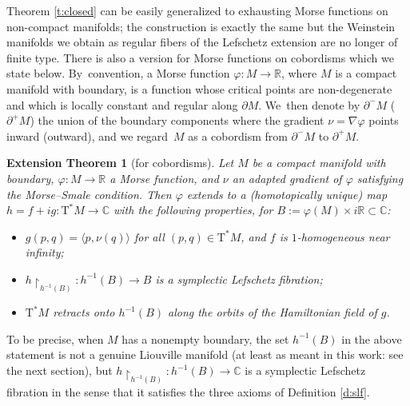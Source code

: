 \documentclass[JEP,XML,SOM,Unicode]{cedram}
\newcommand{\C}{{\mathbb C}}
\newcommand{\R}{{\mathbb R}}
\newcommand{\tu}[1]{\textup{#1}}
\newcommand{\sT}{\mathrm{T}^\ast}
\newcommand{\prg}[1]{\langle #1 \rangle}
\newcommand{\de}{\mathrel{:=}}
\newcommand{\rst}[1]{{\upharpoonright}_{\!#1}}
\let\del\partial
\let\on\colon
\theoremstyle{plain}
\newtheorem{extension-theorem}[theorem]{Extension Theorem}
\theoremstyle{definition}
\begin{document}
Theorem \ref{t:closed} can be easily generalized to exhausting Morse functions
on non-compact manifolds; the construction is exactly the same but the Weinstein
manifolds we obtain as regular fibers of the Lefschetz extension are no longer
of finite type. There is also a version for Morse functions on cobordisms which
we state below. By~convention, a Morse function $\varphi \on M \to \R$, where
$M$ is a compact manifold with boundary, is a function whose critical points are
non-degenerate and which is locally constant and regular along $\del M$. We~then
denote by $\del^-M$ (\resp $\del^+M$) the union of the boundary components
where the gradient $\nu = \nabla\varphi$ points inward (\resp outward), and we
regard~$M$ as a cobordism from $\del^-M$ to $\del^+M$.

\begin{extension-theorem}[for cobordisms] \label{t:compact}
Let $M$ be a compact manifold with boundary, $\varphi \on M \to \R$ a Morse
function, and $\nu$ an adapted gradient of $\varphi$ satisfying the Morse--Smale
condition. Then $\varphi$ extends to a \tu(homotopically unique\tu) map \hbox{$h =f+ig \on \sT M \to \C$} with the following properties, for $B \de
\varphi(M) \times i\R \subset \C$\tu:
\begin{itemize}
\item
$g(p,q) = \prg{p,\nu(q)}$ for all $(p,q) \in \sT M$, and $f$ is $1$-homogeneous
near infinity;
\item
$h \rst{h^{-1}(B)} \on h^{-1}(B) \to B$ is a symplectic Lefschetz fibration\tu;
\item
$\sT M$ retracts onto $h^{-1}(B)$ along the orbits of the Hamiltonian field of
$g$.
\end{itemize}
\end{extension-theorem}

To be precise, when $M$ has a nonempty boundary, the set $h^{-1}(B)$ in the
above statement is not a genuine Liouville manifold (at least as meant in this
work: see the next section), but $h \rst{ h^{-1}(B) } \on h^{-1}(B) \to \C$ is
a symplectic Lefschetz fibration in the sense that it satisfies the three axioms
of Definition \ref{d:slf}.
\end{document}
